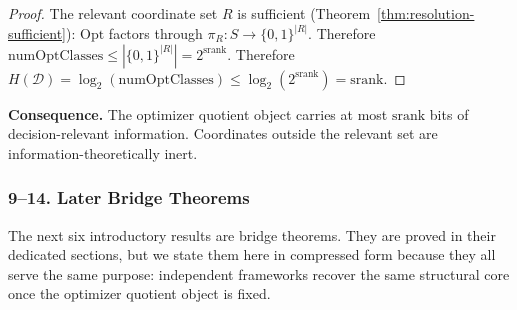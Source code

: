 \begin{proof}
The relevant coordinate set $R$ is sufficient (Theorem~\ref{thm:resolution-sufficient}): $\mathrm{Opt}$ factors through $\pi_R : S \to \{0,1\}^{|R|}$. Therefore $\mathrm{numOptClasses} \leq |\{0,1\}^{|R|}| = 2^{\mathrm{srank}}$. Therefore $H(\mathcal{D}) = \log_2(\mathrm{numOptClasses}) \leq \log_2(2^{\mathrm{srank}}) = \mathrm{srank}$.
\end{proof}

\noindent\textbf{Consequence.} The optimizer quotient object carries at most $\mathrm{srank}$ bits of decision-relevant information. Coordinates outside the relevant set are information-theoretically inert.

\subsubsection{9--14. Later Bridge Theorems}

The next six introductory results are bridge theorems. They are proved in their dedicated sections, but we state them here in compressed form because they all serve the same purpose: independent frameworks recover the same structural core once the optimizer quotient object is fixed.

